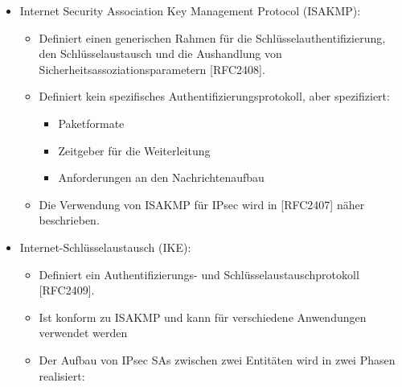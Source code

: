 \documentclass[a4paper]{article}
\begin{document}
\begin{multicols}{3}
\begin{itemize}
              \begin{itemize}
                  \item
                        Internet Security Association Key Management Protocol (ISAKMP):

                        \begin{itemize}
                            \item
                                  Definiert einen generischen Rahmen für die
                                  Schlüsselauthentifizierung, den Schlüsselaustausch und die
                                  Aushandlung von Sicherheitsassoziationsparametern {[}RFC2408{]}.
                            \item
                                  Definiert kein spezifisches Authentifizierungsprotokoll, aber
                                  spezifiziert:

                                  \begin{itemize}
                                      \item
                                            Paketformate
                                      \item
                                            Zeitgeber für die Weiterleitung
                                      \item
                                            Anforderungen an den Nachrichtenaufbau
                                  \end{itemize}
                            \item
                                  Die Verwendung von ISAKMP für IPsec wird in {[}RFC2407{]} näher
                                  beschrieben.
                        \end{itemize}
                  \item
                        Internet-Schlüsselaustausch (IKE):

                        \begin{itemize}
                            \item
                                  Definiert ein Authentifizierungs- und Schlüsselaustauschprotokoll
                                  {[}RFC2409{]}.
                            \item
                                  Ist konform zu ISAKMP und kann für verschiedene Anwendungen
                                  verwendet werden
                            \item
                                  Der Aufbau von IPsec SAs zwischen zwei Entitäten wird in zwei
                                  Phasen realisiert:


\end{itemize}
\end{itemize}
\end{itemize}
\end{multicols}
\end{document}
